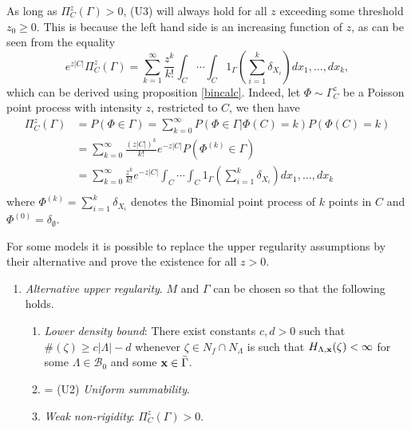 
As long as $\Pi^z_C (\Gamma) >0$, (U3) will always hold for all $z$ exceeding some threshold $z_0 \geq 0$. This is because the left hand side is an increasing function of $z$, as can be seen from the equality 
$$e^{z|C|} \Pi^z_C(\Gamma) = \sum^\infty_{k=1} \frac{z^k}{k!} \int_C \cdots \int_C 1_{\Gamma} \left(\sum^k_{i=1} \delta_{X_i}\right) dx_1, \dots, dx_k,$$
which can be derived using proposition \ref{bincalc}. Indeed, let $\Phi \sim \Gamma^z_C$ be a Poisson point process with intensity $z$, restricted to $C$, we then have
\begin{align*}
	\Pi^z_C(\Gamma) &= P(\Phi \in \Gamma) = \sum^\infty_{k=0} P(\Phi \in \Gamma | \Phi(C) = k) P(\Phi(C)=k) \\
	& = \sum^\infty_{k=0} \frac{(z|C|)^k}{k!} e^{-z|C|} P(\Phi^{(k)}\in \Gamma)\\ 
	& = \sum^\infty_{k=0} \frac{z^k}{k!} e^{-z|C|} \int_C \cdots \int_C 1_{\Gamma} \left(\sum^k_{i=1} \delta_{X_i}\right) dx_1, \dots, dx_k\\
\end{align*}
where $\Phi^{(k)} = \sum^k_{i=1}\delta_{X_i}$ denotes the Binomial point process of $k$ points in $C$ and $\Phi^{(0)} = \delta_\emptyset$.




For some models it is possible to replace the upper regularity assumptions by their alternative and prove the existence for all $z>0$.

\begin{enumerate}[(\textbf{\^{U}})]
	\item \textit{Alternative upper regularity}. $M$ and $\Gamma$ can be chosen so that the following holds.
	\begin{enumerate}[(\^U1)]
		\item \textit{Lower density bound}: There exist constants $c,d > 0$ such that $\#(\zeta) \geq c|\Lambda| - d$ whenever $\zeta \in N_f\cap N_\Lambda$ is such that $H_{\Lambda,{\mathbf{x}}}(\zeta)<\infty$ for some $\Lambda \in \mathcal B_0$ and some ${\mathbf{x}} \in \bar\Gamma$.
		\item = (U2) \textit{Uniform summability}.
		\item \textit{Weak non-rigidity}: $\Pi^z_C(\Gamma) > 0$.
	\end{enumerate}
\end{enumerate}






